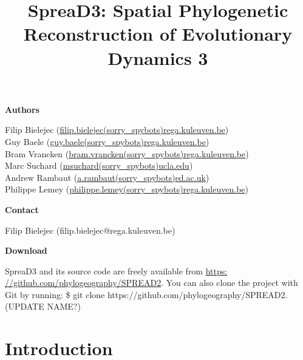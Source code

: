 \documentclass[english]{paper}
\def \spreadname {SpreaD3}
\begin{document}
\title{{\spreadname}: Spatial Phylogenetic Reconstruction of Evolutionary Dynamics 3}
\maketitle

\begin{flushleft}
\textbf{Authors}
\par\end{flushleft}

\noindent
Filip Bielejec (\url{filip.bielejec(sorry_spybots)rega.kuleuven.be}) \\
Guy Baele (\url{guy.baele(sorry_spybots)rega.kuleuven.be}) \\
Bram Vrancken  (\url{bram.vrancken(sorry_spybots)rega.kuleuven.be}) \\
Marc Suchard (\url{msuchard(sorry_spybots)ucla.edu})\\
Andrew Rambaut (\url{a.rambaut(sorry_spybots)ed.ac.uk}) \\
Philippe Lemey (\url{philippe.lemey(sorry_spybots)rega.kuleuven.be}) \\

\begin{flushleft}
\textbf{Contact}
\par\end{flushleft}
Filip Bielejec (filip.bielejec@rega.kuleuven.be) 


\begin{flushleft}
\textbf{Download}
\par\end{flushleft}
SpreaD3 and its source code are freely available from \url{https: //github.com/phylogeography/SPREAD2}.
You can also clone the project with Git by running: \$ git clone https://github.com/phylogeography/SPREAD2. (UPDATE NAME?)

\pagebreak{}
\tableofcontents{}
\pagebreak{}

\section{Introduction}
\end{document}
